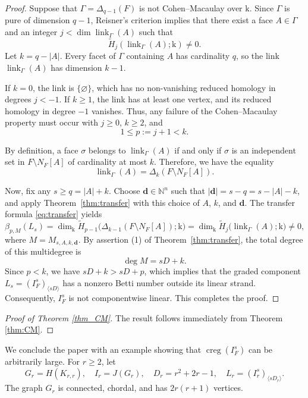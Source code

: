 \documentclass[12pt]{amsart}
\theoremstyle{definition}
\theoremstyle{remark}
\begin{document}
\begin{proof}
Suppose that $\Gamma = \Delta_{q-1}(F)$ is not Cohen--Macaulay over $\mathrm{k}$. Since $\Gamma$ is pure of dimension $q-1$, Reisner's criterion implies that there exist a face $A \in \Gamma$ and an integer $j < \dim \operatorname{link}_\Gamma(A)$ such that
\[
\widetilde{H}_j(\operatorname{link}_\Gamma(A); \mathrm{k}) \neq 0.
\]
Let $k = q - |A|$. Every facet of $\Gamma$ containing $A$ has cardinality $q$, so the link $\operatorname{link}_\Gamma(A)$ has dimension $k-1$.

If $k = 0$, the link is $\{\varnothing\}$, which has no non-vanishing reduced homology in degrees $j < -1$. If $k \ge 1$, the link has at least one vertex, and its reduced homology in degree $-1$ vanishes. Thus, any failure of the Cohen--Macaulay property must occur with $j \ge 0$, $k \ge 2$, and
\[
1 \le p := j + 1 < k.
\]

By definition, a face $\sigma$ belongs to $\operatorname{link}_\Gamma(A)$ if and only if $\sigma$ is an independent set in $F \setminus N_F[A]$ of cardinality at most $k$. Therefore, we have the equality
\[
\operatorname{link}_\Gamma(A) = \Delta_{k}(F \setminus N_F[A]).
\]

Now, fix any $s \ge q = |A| + k$. Choose $\mathbf{d} \in \mathbb{N}^n$ such that $|\mathbf{d}| = s - q = s - |A| - k$, and apply Theorem~\ref{thm:transfer} with this choice of $A$, $k$, and $\mathbf{d}$. The transfer formula \eqref{eq:transfer} yields
\[
\beta_{p, M}(L_s) = \dim_{\mathrm{k}} \widetilde{H}_{p-1}\bigl(\Delta_{k-1}(F \setminus N_F[A]); \mathrm{k}\bigr) = \dim_{\mathrm{k}} \widetilde{H}_{j}\bigl(\operatorname{link}_\Gamma(A); \mathrm{k}\bigr) \neq 0,
\]
where $M = M_{s,A,k,\mathbf{d}}$. By assertion (1) of Theorem~\ref{thm:transfer}, the total degree of this multidegree is
\[
\deg M = sD + k.
\]
Since $p < k$, we have $sD + k > sD + p$, which implies that the graded component $L_s = (I_F^s)_{\langle sD \rangle}$ has a nonzero Betti number outside its linear strand. Consequently, $I_F^s$ is not componentwise linear. This completes the proof.
\end{proof}

\begin{proof}[Proof of Theorem \ref{thm_CM}]
The result follows immediately from Theorem \ref{thm:CM}.
\end{proof}

We conclude the paper with an example showing that $\operatorname{creg}(I_F^s)$ can be arbitrarily large. For $r \ge 2$, let
\[
G_r = H(K_{r,r}), \quad I_r = J(G_r), \quad D_r = r^2 + 2r - 1, \quad L_r = (I_r^s)_{\langle sD_r \rangle}.
\]
The graph $G_r$ is connected, chordal, and has $2r(r + 1)$ vertices.
\end{document}
